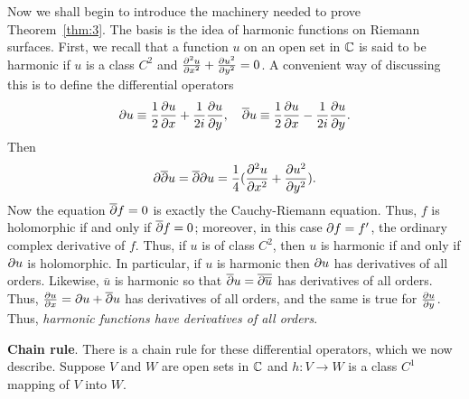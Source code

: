 \documentclass[a4paper,11pt]{article}
\begin{document}
Now we shall begin to introduce the machinery needed to prove
Theorem~\ref{thm:3}.  The basis is the idea of harmonic functions on
Riemann surfaces.  First, we recall that a function $u$ on an open set
in ${\mathbb C}$ is said to be harmonic if $u$ is a class $C^2$ and
$\frac{\partial^2 u}{\partial x^2} + \frac{\partial u^2}{\partial y^2} = 0$.  A convenient way
of discussing this is to define the differential operators
$$
\partial u \equiv \frac{1}{2}\frac{\partial u}{\partial x} 
+ \frac{1}{2i}\frac{\partial u}{\partial y},
\quad
\overline{\partial} u \equiv \frac{1}{2}\frac{\partial u}{\partial x} 
- \frac{1}{2i}\frac{\partial u}{\partial y}.
$$
Then
$$
\partial\overline{\partial} u = \overline{\partial} \partial u
= \frac{1}{4}(\frac{\partial^2 u}{\partial x^2} + \frac{\partial u^2}{\partial y^2}).
$$
Now the equation $\overline{\partial} f = 0$ is exactly the Cauchy-Riemann
equation.  Thus, $f$ is holomorphic if and only if $\overline{\partial} f =
0$; moreover, in this case $\partial f = f'$, the ordinary complex
derivative of $f$.  Thus, if $u$ is of class $C^2$, then $u$ is
harmonic if and only if $\partial u$ is holomorphic.  In particular,
if $u$ is harmonic then $\partial u$ has derivatives of all orders.
Likewise, $\overline{u}$ is harmonic so that $\overline{\partial} u =
\overline{\partial \overline{u}}$ has derivatives of all orders.  Thus,
$\frac{\partial u}{\partial x} = \partial u + \overline{\partial} u$ has derivatives of all
orders, and the same is true for $\frac{\partial u}{\partial y}$.  Thus,
\emph{harmonic functions have derivatives of all orders}.

\textbf{Chain rule}.  There is a chain rule for these differential
operators, which we now describe.  Suppose $V$ and $W$ are open sets
in ${\mathbb C}$ and $h : V \to W$ is a class $C^1$ mapping of $V$ into $W$.
\end{document}
